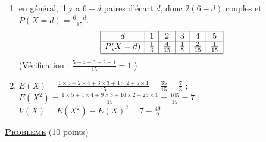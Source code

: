 \begin{enumerate}
\begin{enumerate}
			\item {}
				en général, il y a $6 - d$ paires d'écart $d$, donc $2(6-d)$ couples et $P(X = d) = \frac{6-d}{15}$.
				\[
				\begin{array}{|c|c|c|c|c|c|}
					\hline
					d & 1 & 2 & 3 & 4 & 5 \\ \hline
					P(X=d) & \frac{1}{3} & \frac{4}{15} & \frac{1}{5} & \frac{2}{15} & \frac{1}{15} \\[.5ex] \hline
				\end{array}
				\]
				(Vérification : $\frac{5+4+3+2+1}{15} = 1$.)
			\item {}
				$E(X) = \frac{1\times5 + 2\times4 + 3\times3 + 4\times2 + 5\times1}{15} = \frac{35}{15} = \frac{7}{3}$ ;
				$E(X^2) = \frac{1\times5 + 4\times4 + 9\times3 + 16\times2 + 25\times1}{15} = \frac{105}{15} = 7$ ;
				$V(X) = E(X^2) - E(X)^2 = 7 - \frac{49}{9}$.

		\end{enumerate}
	\end{enumerate}
\noindent \underline{\textsc{\textbf{Probleme}}} (10 points)
